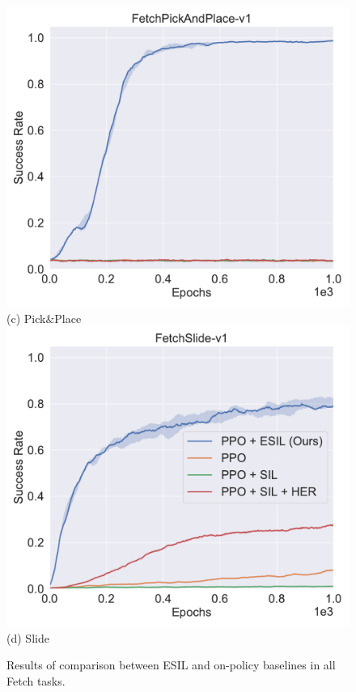 \begin{figure}[h!]
  \includegraphics[width=\linewidth]{figures/chapter3/pick_baseline.pdf}
  ({c}) Pick$\&$Place
\endminipage
{}%
  \centering
  \includegraphics[width=\linewidth]{figures/chapter3/slide_baseline.pdf}
  ({d}) Slide
\endminipage\hfill
\caption{Results of comparison between ESIL and on-policy baselines in all Fetch tasks. }
\label{fig:baseline_compare}
\end{figure}

